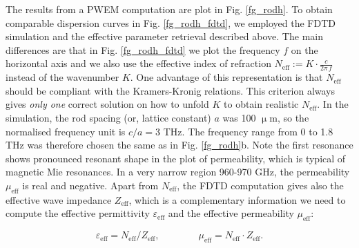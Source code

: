 {The results from a PWEM computation are plot in Fig. \ref{fg_rodh}. To obtain comparable dispersion curves in Fig. \ref{fg_rodh_fdtd}, we employed the FDTD simulation and the effective parameter retrieval described above. The main differences are that in Fig. \ref{fg_rodh_fdtd} we plot the frequency $f$ on the horizontal axis and we also use the effective index of refraction $N_{\text{eff}} := K\cdot \frac{c}{2\pi\,f}$ instead of the wavenumber $K$. One advantage of this representation is that $N_{\text{eff}}$ should be compliant with the Kramers-Kronig relations. This criterion always gives \textit{only one} correct solution on how to unfold $K$ to obtain realistic $N_{\text{eff}}$. 
In the simulation, the rod spacing (or, lattice constant) $a$ was 100 $\upmu$m, so the normalised frequency unit is $c/a = 3$ THz. The frequency range from 0 to 1.8 THz was therefore chosen the same as in Fig. \ref{fg_rodh}b. 
Note the first resonance shows pronounced resonant shape in the plot of permeability, which is typical of magnetic Mie resonances. In a very narrow region 960-970 GHz, the permeability $\mu_{\text{eff}}$ is real and negative. 
Apart from $N_{\text{eff}}$, the FDTD computation gives also the effective wave impedance $Z_{\text{eff}}$, which is a complementary information we need to compute the effective permittivity $\varepsilon_{\text{eff}}$ and the effective permeability $\mu_{\text{eff}}$:

\begin{equation} \varepsilon_{\text{eff}} = N_{\text{eff}}/Z_{\text{eff}}, \quad\quad\quad\quad \mu_{\text{eff}} = N_{\text{eff}}\cdot Z_{\text{eff}}.
\label{eq_epsmu}\end{equation}

}
